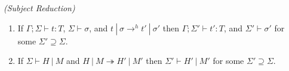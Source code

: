 \begin{thmun}
\emph{(Subject Reduction)}

\begin{enumerate}

\item If $\Gamma ; \Sigma \vdash t : T$, $\Sigma \vdash \sigma$, and $t~|~\sigma \rightarrow^h t'~|~\sigma'$ then $\Gamma ; \Sigma' \vdash t' : T$, and $\Sigma' \vdash \sigma'$ for some $\Sigma' \supseteq \Sigma$.

\item If $\Sigma \vdash H~|~M$ and $H~|~M \twoheadrightarrow H'~|~M'$ then $\Sigma' \vdash H'~|~M'$ for some $\Sigma' \supseteq \Sigma$.

\end{enumerate}

\end{thmun}
